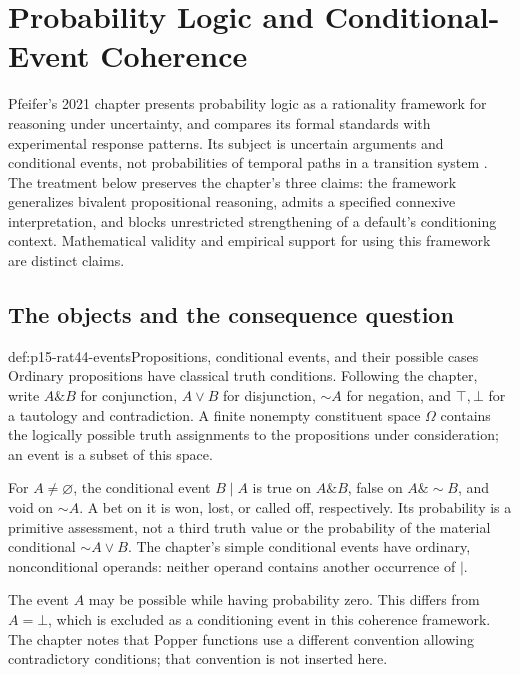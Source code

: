 \chapter{Probability Logic and Conditional-Event Coherence}
\label{sec:p15-rationality-4-4}

Pfeifer's 2021 chapter presents probability logic as a rationality
framework for reasoning under uncertainty, and compares its formal
standards with experimental response patterns. Its subject is uncertain
arguments and conditional events, not probabilities of temporal paths
in a transition system \cite[pp.~277--284]{Pfeifer2021ProbabilityLogic}.
The treatment below preserves the chapter's three claims: the framework
generalizes bivalent propositional reasoning, admits a specified connexive
interpretation, and blocks unrestricted strengthening of a default's
conditioning context. Mathematical validity and empirical support for
using this framework are distinct claims.

\section{The objects and the consequence question}

\begin{hbdefinition}{def:p15-rat44-events}{Propositions, conditional events, and their possible cases}
Ordinary propositions have classical truth conditions. Following the
chapter, write \(A\mathbin{\&}B\) for conjunction, \(A\lor B\) for
disjunction, \(\sim A\) for negation, and \(\top,\bot\) for a
tautology and contradiction. A finite nonempty constituent space \(\Omega\)
contains the logically possible truth assignments to the propositions
under consideration; an event is a subset of this space.

For \(A\ne\varnothing\), the conditional event \(B\mid A\) is
true on \(A\mathbin{\&}B\), false on
\(A\mathbin{\&}\sim B\), and void on \(\sim A\). A bet on it is
won, lost, or called off, respectively. Its probability is a primitive
assessment, not a third truth value or the probability of the material
conditional \(\sim A\lor B\). The chapter's simple conditional events
have ordinary, nonconditional operands: neither operand contains
another occurrence of \(\mid\).

The event \(A\) may be possible while having probability zero.
This differs from \(A=\bot\), which is excluded as a conditioning
event in this coherence framework. The chapter notes that Popper
functions use a different convention allowing contradictory conditions;
that convention is not inserted here.
\end{hbdefinition}

